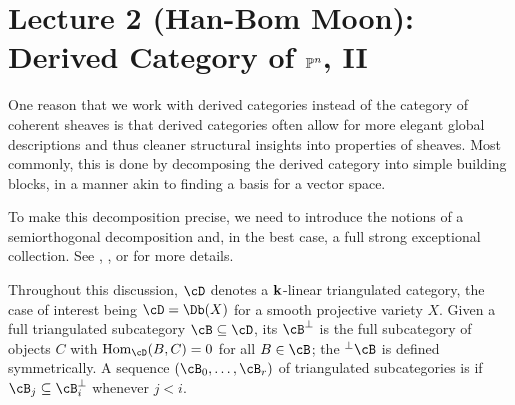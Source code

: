 \documentclass{amsart}
\begin{document}
\section{Lecture 2 (Han-Bom Moon): Derived Category of $\mathbb P^n$, II}\label{lec:2-DbPPn}
One reason that we work with derived categories instead of the category of coherent sheaves is that derived categories often allow for more elegant global descriptions and thus cleaner structural insights into properties of sheaves.
Most commonly, this is done by decomposing the derived category into simple building blocks, in a manner akin to finding a basis for a vector space.

To make this decomposition precise, we need to introduce the notions of a semiorthogonal decomposition and, in the best case, a full strong exceptional collection. See \cite[\S1.4]{Huybrechts2006}, \cite[\S3]{Caldararu05}, or \cite{Kuznetsov14} for more details.

Throughout this discussion, $\cD$ denotes a ${\bf k}$-linear triangulated category, the case of interest being $\cD = \Db(X)$ for a smooth projective variety $X$.  Given a full triangulated subcategory $\cB\subseteq \cD$, its  $\cB^\perp$ is the full subcategory of objects $C$ with $\Hom_\cD(B, C)=0$ for all $B\in\cB$; the  ${}^\perp\cB$ is defined symmetrically. A sequence $(\cB_0,\dots,\cB_r)$ of triangulated subcategories is  if $\cB_j\subseteq \cB_i^\perp$ whenever $j<i$.
\end{document}
